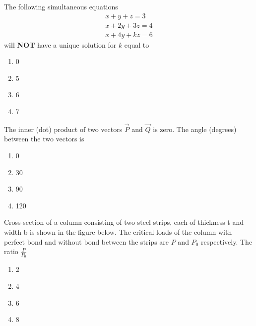 \item The following simultaneous equations
\begin{align*}
    x + y + z = 3\\
    x + 2y + 3z = 4\\
    x + 4y + kz = 6
\end{align*}
will \textbf{NOT} have a unique solution for $k$ equal to
\begin{multicols}{2}
    \begin{enumerate}
        \item 0
        \item 5
        \item 6
        \item 7
    \end{enumerate}
\end{multicols}

\item The inner (dot) product of two vectors $\vec{P}$ and $\vec{Q}$ is zero. The angle (degrees) between the two vectors is
\begin{multicols}{2}
    \begin{enumerate}
        \item 0
        \item 30
        \item 90
        \item 120
    \end{enumerate}
\end{multicols}

\item Cross-section of a column consisting of two steel strips, each of thickness t and width b is shown in the figure below. The critical loads of the column with perfect bond and without bond between the strips are $P$ and $P_0$ respectively. The ratio $\frac{P}{P_0}$
\centering
{}
\begin{multicols}{2}
    \begin{enumerate}
        \item 2
        \item 4
        \item 6
        \item 8
    \end{enumerate}
\end{multicols}

